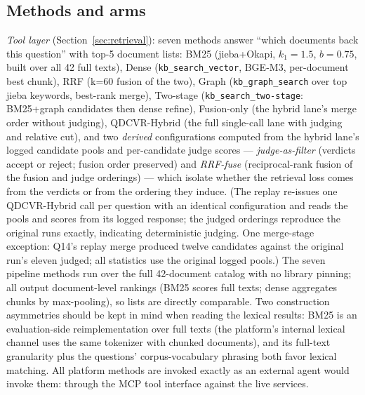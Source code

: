 \subsection{Methods and arms}
\sloppypar
\emph{Tool layer} (Section~\ref{sec:retrieval}): seven methods answer ``which
documents back this question'' with top-5 document lists: BM25 (jieba+Okapi,
$k_1{=}1.5$, $b{=}0.75$, built over all 42 full texts), Dense
(\texttt{kb\_search\_vector}, BGE-M3, per-document best chunk), RRF (k=60
fusion of the two), Graph (\texttt{kb\_graph\_search} over top jieba
keywords, best-rank merge), Two-stage (\texttt{kb\_search\_two-stage}:
BM25+graph candidates then dense refine), Fusion-only (the hybrid lane's
merge order without judging), QDCVR-Hybrid (the full single-call lane
with judging and relative cut), and two \emph{derived} configurations
computed from the hybrid lane's logged candidate pools and per-candidate
judge scores --- \emph{judge-as-filter} (verdicts accept or reject; fusion
order preserved) and \emph{RRF-fuse} (reciprocal-rank fusion of the fusion
and judge orderings) --- which isolate whether the retrieval loss comes
from the verdicts or from the ordering they induce. (The replay re-issues
one QDCVR-Hybrid call per question with an identical configuration and
reads the pools and scores from its logged response; the judged orderings
reproduce the original runs exactly, indicating deterministic judging.
One merge-stage exception: Q14's replay merge produced twelve candidates
against the original run's eleven judged; all statistics use the original
logged pools.)
The seven pipeline methods
run over the full
42-document catalog with no library pinning; all output document-level
rankings (BM25 scores full texts; dense aggregates chunks by max-pooling),
so lists are directly comparable. Two construction asymmetries should be
kept in mind when reading the lexical results: BM25 is an evaluation-side
reimplementation over full texts (the platform's internal lexical channel
uses the same tokenizer with chunked documents), and its full-text
granularity plus the questions' corpus-vocabulary phrasing both favor
lexical matching. All platform methods are invoked exactly as
an external agent would invoke them: through the MCP tool interface against
the live services.

